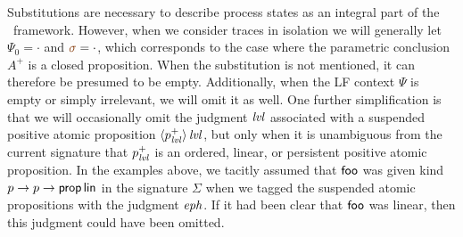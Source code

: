 Substitutions are necessary to describe process states as an integral
part of the \sls~framework. However, when we consider traces in
isolation we will generally let $\Psi_0 = \cdot$ and $\lf{\sigma} =
\cdot$, which corresponds to the case where the parametric conclusion
$A^+$ is a closed proposition. When the substitution is not mentioned,
it can therefore be presumed to be empty. Additionally, when the LF
context $\Psi$ is empty or simply irrelevant, we will omit it as
well. One further simplification is that we will occasionally omit the
judgment ${\it lvl}$ associated with a suspended positive atomic
proposition ${\langle {p^+_{\it lvl}} \rangle}\,{{\it lvl}}$, but only when it is
unambiguous from the current signature that $p^+_{\it lvl}$ is an ordered,
linear, or persistent positive atomic proposition. In the examples
above, we tacitly assumed that ${\sf foo}$ was given kind $p
\rightarrow p \rightarrow {\sf prop}\,{\sf lin}$ in the signature
$\Sigma$ when we tagged the suspended atomic propositions with the
judgment ${\it eph}$. If it had been clear that ${\sf foo}$ was linear,
then this judgment could have been omitted.



